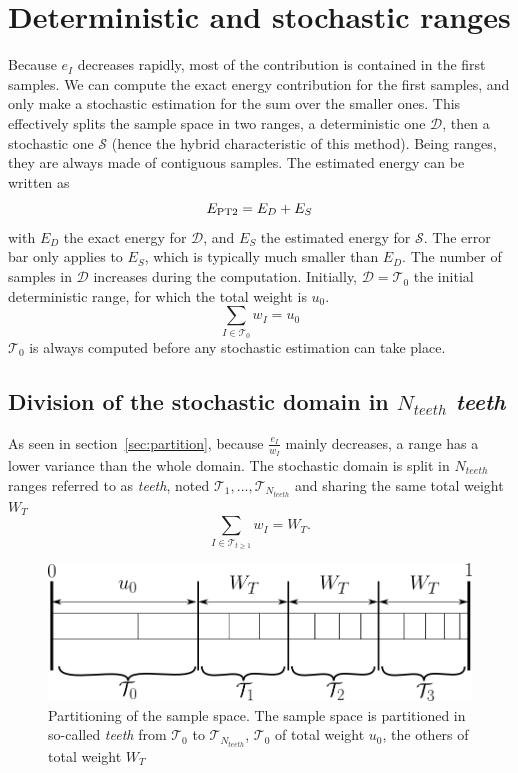 \documentclass[./thesis.tex]{subfiles}
\begin{document}
\section{Deterministic and stochastic ranges}
Because $e_I$ decreases rapidly, most of the contribution is contained in the first samples. We can compute the exact energy contribution for the first samples, and only make a stochastic estimation for the sum over the smaller ones. This effectively splits the sample space in two ranges, a deterministic one $\mathcal{D}$, then a stochastic one $\mathcal{S}$ (hence the hybrid characteristic of this method). Being ranges, they are always made of contiguous samples. The estimated energy can be written as
\begin{equation}
E_\text{PT2} = E_D + E_S
\end{equation}
with $E_D$ the exact energy for $\mathcal{D}$, and $E_S$ the estimated energy for $\mathcal{S}$. The error bar only applies to $E_S$, which is typically much smaller than $E_D$.
The number of samples in $\mathcal{D}$ increases during the computation. Initially, $\mathcal{D}=\mathcal{T}_0$ the initial deterministic range, for which the total weight is $u_0$.
\begin{equation}
\sum_{I \in \mathcal{T}_0} w_I=u_0
\end{equation}
$\mathcal{T}_0$ is always computed before any stochastic estimation can take place.

\subsection{Division of the stochastic domain in $N_{teeth}$ \emph{teeth}}

As seen in section~\ref{sec:partition}, because $\frac{e_I}{w_I}$ mainly decreases, a range has a lower variance than the whole domain. The stochastic domain is split in $N_{teeth}$ ranges referred to as \emph{teeth}, noted $\mathcal{T}_1,\ldots,\mathcal{T}_{N_{teeth}}$ and sharing the same total weight $W_T$
\begin{equation}
\sum_{I \in \mathcal{T}_{t \geq 1}} w_I=W_T.
\end{equation}

 \begin{figure}[h!]
	\begin{center}
	\includegraphics[width=0.9\columnwidth]{figures/pt2/teeth}
	\end{center}
	\caption{Partitioning of the sample space.
		The sample space is partitioned in so-called \emph{teeth} from $\mathcal{T}_0$ to $\mathcal{T}_{N_{teeth}}$, $\mathcal{T}_0$ of total weight $u_0$, the others of total weight $W_T$}
	\label{fig:teeth}
\end{figure}
\end{document}
